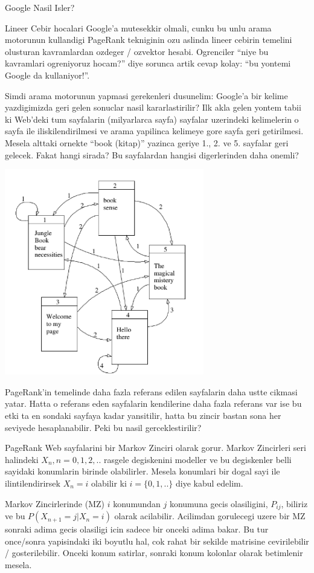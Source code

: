 \documentclass[12pt,fleqn]{article}\usepackage{../common}
\begin{document}
Google Nasil Isler? 

Lineer Cebir hocalari Google'a mutesekkir olmali, cunku bu unlu arama
motorunun kullandigi PageRank tekniginin ozu aslinda lineer cebirin
temelini olusturan kavramlardan ozdeger / ozvektor hesabi. Ogrenciler
``niye bu kavramlari ogreniyoruz hocam?''  diye sorunca artik cevap
kolay: ``bu yontemi Google da kullaniyor!''.

Simdi arama motorunun yapmasi gerekenleri dusunelim: Google'a bir kelime
yazdigimizda geri gelen sonuclar nasil kararlastirilir? Ilk akla gelen
yontem tabii ki Web'deki tum sayfalarin (milyarlarca sayfa) sayfalar
uzerindeki kelimelerin o sayfa ile iliskilendirilmesi ve arama yapilinca
kelimeye gore sayfa geri getirilmesi. Mesela alttaki ornekte ``book
(kitap)'' yazinca geriye 1., 2. ve 5. sayfalar geri gelecek. Fakat hangi
sirada? Bu sayfalardan hangisi digerlerinden daha onemli?

\includegraphics[height=9cm]{pg2.png}

PageRank'in temelinde daha fazla referans edilen sayfalarin daha ustte
cikmasi yatar. Hatta o referans eden sayfalarin kendilerine daha fazla
referans var ise bu etki ta en sondaki sayfaya kadar yansitilir, hatta bu
zincir bastan sona her seviyede hesaplanabilir. Peki bu nasil
gerceklestirilir?

PageRank Web sayfalarini bir Markov Zinciri olarak gorur. Markov Zincirleri
seri halindeki $X_n, n=0,1,2,..$ rasgele degiskenini modeller ve bu
degiskenler belli sayidaki konumlarin birinde olabilirler. Mesela konumlari
bir dogal sayi ile ilintilendirirsek $X_n = i$ olabilir ki $i=\{0,1,..\}$
diye kabul edelim.

Markov Zincirlerinde (MZ) $i$ konumundan $j$ konumuna gecis olasiligini,
$P_{ij}$, biliriz ve bu $P(X_{n+1} = j | X_{n} = i)$ olarak acilabilir. Acilimdan  
gorulecegi uzere bir MZ sonraki adima gecis olasiligi icin sadece
bir onceki adima bakar. Bu tur once/sonra yapisindaki iki boyutlu hal, 
cok rahat bir sekilde matrisine cevirilebilir / gosterilebilir. Onceki konum 
satirlar, sonraki konum kolonlar olarak betimlenir mesela. 
\end{document}
